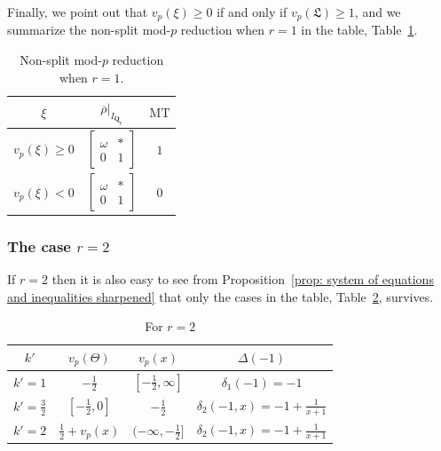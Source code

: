 \documentclass[11pt]{amsart}
\theoremstyle{definition}
\numberwithin{equation}{subsection}
\theoremstyle{plain}
\theoremstyle{plain}
\theoremstyle{plain}
\theoremstyle{plain}
\theoremstyle{plain}
\theoremstyle{plain}
\theoremstyle{plain}
\theoremstyle{plain}
\theoremstyle{plain}
\theoremstyle{plain}
\theoremstyle{plain}
\theoremstyle{plain}
\theoremstyle{definition}
\theoremstyle{definition}
\theoremstyle{definition}
\theoremstyle{remark}
\renewcommand{\(}{\textup{(}}
\renewcommand{\)}{\textup{)}}
\newcommand{\Qp}{\mathbf{Q}_p}
\newcommand{\rhobar}{\overline{\rho}}
\newcommand{\fL}{\mathfrak{L}}
\begin{document}
Finally, we point out that $v_p(\xi)\geq 0$ if and only if $v_p(\fL)\geq 1$, and we summarize the non-split mod-$p$ reduction when $r=1$ in the table, Table~\ref{tab: r=1, reduction}.
\begin{small}
\begin{table}
  \begin{tabular}{|c||c|c|}
  \hline
      $\xi$ & $\rhobar|_{I_{\Qp}}$ & $\mathrm{MT}$ \\\hline\hline
      $v_p(\xi)\geq 0$
      & $
      \begin{bmatrix}
          \omega & * \\ 0 & 1
      \end{bmatrix}$
      & $1$ \\\hline
      $v_p(\xi)<0$
      & $
      \begin{bmatrix}
          \omega & * \\ 0 & 1
      \end{bmatrix}$
      & $0$ \\\hline
  \end{tabular}
  \caption{Non-split mod-$p$ reduction when $r=1$.}    \label{tab: r=1, reduction}
\end{table}
\end{small}





\subsubsection{\textbf{The case $r=2$}}
If $r=2$ then it is also easy to see from Proposition~\ref{prop: system of equations and inequalities sharpened} that only the cases in the table, Table~\ref{tab: r=2}, survives.
\begin{small}
\begin{table}[htbp]
  \begin{tabular}{|c||c|c|c|}
  \hline
    $k'$ & $v_p(\Theta)$ & $v_p(x)$ & $\Delta(-1)$ \\ \hline\hline
    $k'=1$ & $-\frac{1}{2}$ & $[-\frac{1}{2},\infty]$ & $\delta_1(-1)=-1$ \\\hline
    $k'=\frac{3}{2}$ & $[-\frac{1}{2},0]$ & $-\frac{1}{2}$ & $\delta_2(-1,x)=-1+\frac{1}{x+1}$ \\\hline
    $k'=2$ & $\frac{1}{2}+v_p(x)$ & $(-\infty,-\frac{1}{2}]$ & $\delta_2(-1,x)=-1+\frac{1}{x+1}$ \\ \hline
  \end{tabular}
  \caption{For $r=2$}    \label{tab: r=2}
\end{table}
\end{small}
\end{document}
